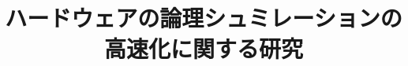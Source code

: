 \usepackage[sc]{mathpazo}
\usepackage[scaled]{helvet}
\usepackage[scaled]{beramono}
\usepackage[deluxe,expert]{otf}
\usepackage{textcomp,okumacro}
\usepackage[bthesis]{archlab}
\graphicspath{{img/}}
\title{ハードウェアの論理シュミレーションの\\ 高速化に関する研究}

\kougai{}

\setcounter{tocdepth}{3}